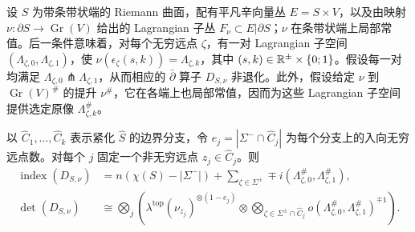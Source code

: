 设 $S$ 为带条带状端的 Riemann 曲面，配有平凡辛向量丛 $E=S\times V$，以及由映射 $\nu:\partial S\to\operatorname{Gr}(V)$ 给出的 Lagrangian 子丛 $F_\nu\subset E|\partial S$；$\nu$ 在条带状端上局部常值。后一条件意味着，对每个无穷远点 $\zeta$，有一对 Lagrangian 子空间 $(\Lambda_{\zeta,\allowbreak 0},\allowbreak \Lambda_{\zeta,\allowbreak 1})$，使 $\nu(\epsilon_\zeta(s,\allowbreak k))=\Lambda_{\zeta,\allowbreak k}$，其中 $(s,\allowbreak k)\in\mathbb R^\pm\times\{0;1\}$。假设每一对均满足 $\Lambda_{\zeta,\allowbreak 0}\pitchfork\Lambda_{\zeta,\allowbreak 1}$，从而相应的 $\bar\partial$ 算子 $D_{S,\allowbreak \nu}$ 非退化。此外，假设给定 $\nu$ 到 $\operatorname{Gr}(V)^\#$ 的提升 $\nu^\#$，它在各端上也局部常值，因而为这些 Lagrangian 子空间提供选定原像 $\Lambda_{\zeta,\allowbreak k}^\#$。
\begin{proposition}\label{st:11.13}
以 $\hat C_1,\allowbreak \ldots,\allowbreak \hat C_k$ 表示紧化 $\hat S$ 的边界分支，令 $e_j=|\Sigma^-\cap\hat C_j|$ 为每个分支上的入向无穷远点数。对每个 $j$ 固定一个非无穷远点 $z_j\in\hat C_j$。则
\begin{equation}\label{eq:11.26}
\begin{aligned}
\operatorname{index}(D_{S,\nu})&=n(\chi(S)-|\Sigma^-|)+\sum_{\zeta\in\Sigma^\pm}\mp i(\Lambda_{\zeta,0}^\#,\Lambda_{\zeta,1}^\#),\\
\det(D_{S,\nu})&\cong\bigotimes_j\left(\lambda^{\mathrm{top}}(\nu_{z_j})^{\otimes(1-e_j)}
\otimes\bigotimes_{\zeta\in\Sigma^\pm\cap\hat C_j}o(\Lambda_{\zeta,0}^\#,\Lambda_{\zeta,1}^\#)^{\mp1}\right).
\end{aligned}
\end{equation}
\end{proposition}

